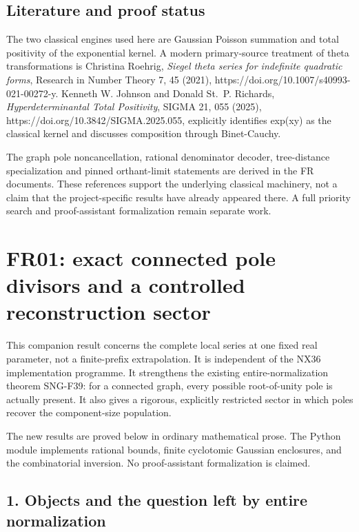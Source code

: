 \documentclass[
  11pt,
  a4paper,
]{report}
\begin{document}
\hypertarget{literature-and-proof-status}{%
\section{Literature and proof
status}\label{literature-and-proof-status}}

The two classical engines used here are Gaussian Poisson summation and
total positivity of the exponential kernel. A modern primary-source
treatment of theta transformations is Christina Roehrig, \emph{Siegel
theta series for indefinite quadratic forms}, Research in Number Theory
7, 45 (2021), https://doi.org/10.1007/s40993-021-00272-y. Kenneth W.
Johnson and Donald St.~P. Richards, \emph{Hyperdeterminantal Total
Positivity}, SIGMA 21, 055 (2025),
https://doi.org/10.3842/SIGMA.2025.055, explicitly identifies exp(xy) as
the classical kernel and discusses composition through Binet-Cauchy.

The graph pole noncancellation, rational denominator decoder,
tree-distance specialization and pinned orthant-limit statements are
derived in the FR documents. These references support the underlying
classical machinery, not a claim that the project-specific results have
already appeared there. A full priority search and proof-assistant
formalization remain separate work.

\hypertarget{fr01-exact-connected-pole-divisors-and-a-controlled-reconstruction-sector}{%
\chapter{FR01: exact connected pole divisors and a controlled
reconstruction
sector}\label{fr01-exact-connected-pole-divisors-and-a-controlled-reconstruction-sector}}

This companion result concerns the complete local series at one fixed
real parameter, not a finite-prefix extrapolation. It is independent of
the NX36 implementation programme. It strengthens the existing
entire-normalization theorem SNG-F39: for a connected graph, every
possible root-of-unity pole is actually present. It also gives a
rigorous, explicitly restricted sector in which poles recover the
component-size population.

The new results are proved below in ordinary mathematical prose. The
Python module implements rational bounds, finite cyclotomic Gaussian
enclosures, and the combinatorial inversion. No proof-assistant
formalization is claimed.

\hypertarget{objects-and-the-question-left-by-entire-normalization}{%
\section{1. Objects and the question left by entire
normalization}\label{objects-and-the-question-left-by-entire-normalization}}
\end{document}
